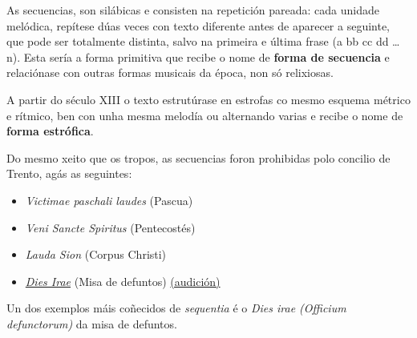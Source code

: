 \documentclass[a4paper, twoside]{templates/ociamthesis}
\providecommand{\tightlist}{%
  \setlength{\itemsep}{0pt}\setlength{\parskip}{0pt}}
\begin{document}
As secuencias, son silábicas e consisten na repetición pareada: cada unidade melódica, repítese dúas veces con texto diferente antes de aparecer a seguinte, que pode ser totalmente distinta, salvo na primeira e última frase (a bb cc dd \ldots{} n). Esta sería a forma primitiva que recibe o nome de \textbf{forma de secuencia} e relaciónase con outras formas musicais da época, non só relixiosas.

A partir do século XIII o texto estrutúrase en estrofas co mesmo esquema métrico e rítmico, ben con unha mesma melodía ou alternando varias e recibe o nome de \textbf{forma estrófica}.

Do mesmo xeito que os tropos, as secuencias foron prohibidas polo concilio de Trento, agás as seguintes:

\begin{itemize}
\tightlist
\item
  \emph{Victimae paschali laudes} (Pascua)
\item
  \emph{Veni Sancte Spiritus} (Pentecostés)
\item
  \emph{Lauda Sion} (Corpus Christi)
\item
  \href{https://gl.wikipedia.org/wiki/Dies_irae}{\emph{Dies Irae}} (Misa de defuntos) \href{https://open.spotify.com/track/7IDZBDMZEkVzqHx3gpQ9yj?si=ca6c04c67bbc4f23}{(audición)}
\end{itemize}

Un dos exemplos máis coñecidos de \emph{sequentia} é o \emph{Dies irae (Officium defunctorum)} da misa de defuntos.
\end{document}
